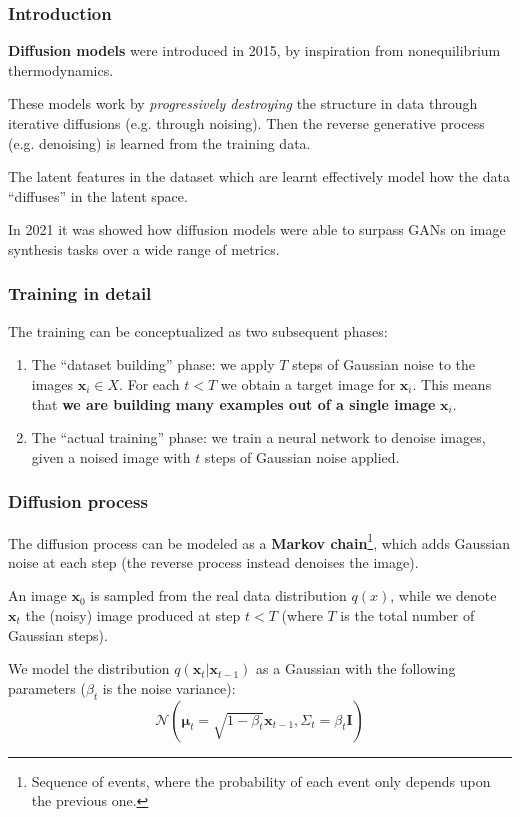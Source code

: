 \begin{frame}
    \frametitle{Introduction}
    \textbf{Diffusion models} were introduced in 2015, by inspiration from nonequilibrium thermodynamics.

    These models work by \emph{progressively destroying} the structure in data through iterative diffusions (e.g. through noising). Then the reverse generative process (e.g. denoising) is learned from the training data.

    The latent features in the dataset which are learnt effectively model how the data ``diffuses'' in the latent space.


    In 2021 it was showed how diffusion models were able to surpass GANs on image synthesis tasks over a wide range of metrics. \cite{diffusion-gan}
\end{frame}

\begin{frame}
    \frametitle{Training in detail}

    The training can be conceptualized as two subsequent phases:
    \begin{enumerate}
        \item The ``dataset building'' phase: we apply $T$ steps of Gaussian noise to the images $\textbf{x}_i \in X$. For each $t < T$ we obtain a target image for $\textbf{x}_i$. This means that \textbf{we are building many examples out of a single image} $\textbf{x}_i$.
        \item The ``actual training'' phase: we train a neural network to denoise images, given a noised image with $t$ steps of Gaussian noise applied.
    \end{enumerate}
\end{frame}

\begin{frame}
    \frametitle{Diffusion process}
    The diffusion process can be modeled as a \textbf{Markov chain}\footnote{Sequence of events, where the probability of each event only depends upon the previous one.}, which adds Gaussian noise at each step (the reverse process instead denoises the image).

    An image $\textbf{x}_0$ is sampled from the real data distribution $q(x)$, while we denote $\textbf{x}_t$ the (noisy) image produced at step $t < T$ (where $T$ is the total number of Gaussian steps).

    We model the distribution $q(\textbf{x}_t|\textbf{x}_{t-1})$ as a Gaussian with the following parameters ($\beta_t$ is the noise variance):
    $$\mathcal{N}(\bm\mu_t=\sqrt{1-\beta_t}\textbf{x}_{t-1}, \Sigma_t = \beta_t \textbf{I})$$
\end{frame}

